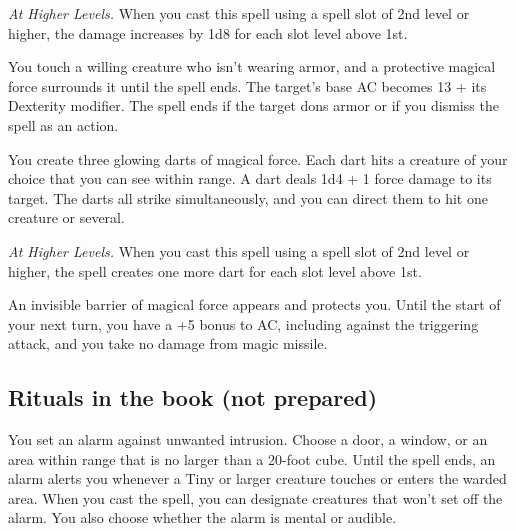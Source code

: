 \documentclass[letterpaper,twocolumn,openany,nodeprecatedcode,justified]{dndbook}
\begin{document}
\emph{At Higher Levels.} When you cast this spell using a spell slot of 2nd level or higher, the damage increases by 1d8 for each slot level above 1st.


You touch a willing creature who isn't wearing armor, and a protective magical force surrounds it until the spell ends. The target's base AC becomes 13 + its Dexterity modifier. The spell ends if the target dons armor or if you dismiss the spell as an action.


You create three glowing darts of magical force. Each dart hits a creature of your choice that you can see within range. A dart deals 1d4 + 1 force damage to its target. The darts all strike simultaneously, and you can direct them to hit one creature or several.

\emph{At Higher Levels.} When you cast this spell using a spell slot of 2nd level or higher, the spell creates one more dart for each slot level above 1st.


An invisible barrier of magical force appears and protects you. Until the start of your next turn, you have a +5 bonus to AC, including against the triggering attack, and you take no damage from magic missile.

\subsection*{Rituals in the book (not prepared)}


You set an alarm against unwanted intrusion. Choose a door, a window, or an area within range that is no larger than a 20-foot cube. Until the spell ends, an alarm alerts you whenever a Tiny or larger creature touches or enters the warded area. When you cast the spell, you can designate creatures that won't set off the alarm. You also choose whether the alarm is mental or audible.
\end{document}
